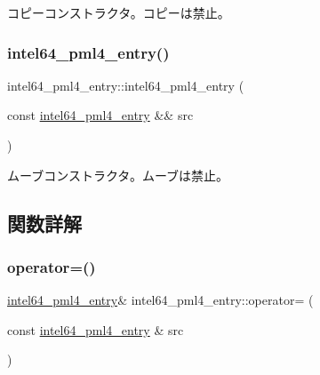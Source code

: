 コピーコンストラクタ。コピーは禁止。 \hypertarget{classintel64__pml4__entry_a9a501655ea95565e7807d1e601ee8dbc}{}\label{classintel64__pml4__entry_a9a501655ea95565e7807d1e601ee8dbc} 
\subsubsection{\texorpdfstring{intel64\+\_\+pml4\+\_\+entry()}{intel64\_pml4\_entry()}\hspace{0.1cm}{\footnotesize\ttfamily [3/3]}}
{\footnotesize\ttfamily intel64\+\_\+pml4\+\_\+entry\+::intel64\+\_\+pml4\+\_\+entry (\begin{DoxyParamCaption}\item[{const \hyperlink{classintel64__pml4__entry}{intel64\+\_\+pml4\+\_\+entry} \&\&}]{src }\end{DoxyParamCaption})\hspace{0.3cm}{\ttfamily [delete]}}

ムーブコンストラクタ。ムーブは禁止。 

\subsection{関数詳解}
\hypertarget{classintel64__pml4__entry_a521515099b02b2905b67fb2036880c10}{}\label{classintel64__pml4__entry_a521515099b02b2905b67fb2036880c10} 
\subsubsection{\texorpdfstring{operator=()}{operator=()}\hspace{0.1cm}{\footnotesize\ttfamily [1/2]}}
{\footnotesize\ttfamily \hyperlink{classintel64__pml4__entry}{intel64\+\_\+pml4\+\_\+entry}\& intel64\+\_\+pml4\+\_\+entry\+::operator= (\begin{DoxyParamCaption}\item[{const \hyperlink{classintel64__pml4__entry}{intel64\+\_\+pml4\+\_\+entry} \&}]{src }\end{DoxyParamCaption})\hspace{0.3cm}{\ttfamily [delete]}}

